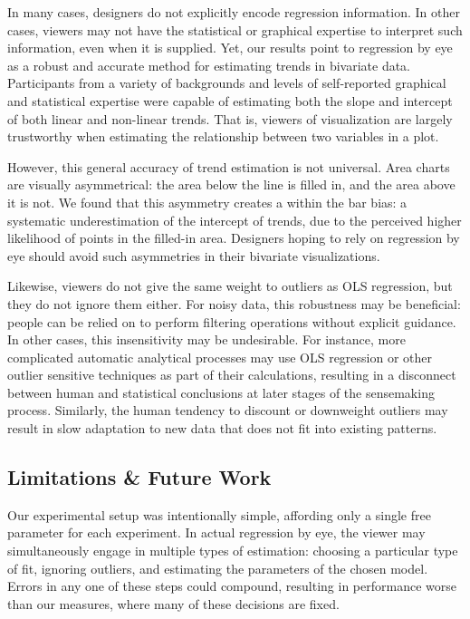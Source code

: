 \documentclass{sigchi}
\begin{document}
In many cases, designers do not explicitly encode regression information. In other cases, viewers may not have the statistical or graphical expertise to interpret such information, even when it is supplied. Yet, our results point to regression by eye as a robust and accurate method for estimating trends in bivariate data. Participants from a variety of backgrounds and levels of self-reported graphical and statistical expertise were capable of estimating both the slope and intercept of both linear and non-linear trends. That is, viewers of visualization are largely trustworthy when estimating the relationship between two variables in a plot.

However, this general accuracy of trend estimation is not universal. Area charts are visually asymmetrical: the area below the line is filled in, and the area above it is not. We found that this asymmetry creates a within the bar bias: a systematic underestimation of the intercept of trends, due to the perceived higher likelihood of points in the filled-in area. Designers hoping to rely on regression by eye should avoid such asymmetries in their bivariate visualizations.

Likewise, viewers do not give the same weight to outliers as OLS regression, but they do not ignore them either. For noisy data, this robustness may be beneficial: people can be relied on to perform filtering operations without explicit guidance. In other cases, this insensitivity may be undesirable. For instance, more complicated automatic analytical processes may use OLS regression or other outlier sensitive techniques as part of their calculations, resulting in a disconnect between human and statistical conclusions at later stages of the sensemaking process. Similarly, the human tendency to discount or downweight outliers may result in slow adaptation to new data that does not fit into existing patterns.

\subsection{Limitations \& Future Work}

Our experimental setup was intentionally simple, affording only a single free parameter for each experiment. In actual regression by eye, the viewer may simultaneously engage in multiple types of estimation: choosing a particular type of fit, ignoring outliers, and estimating the parameters of the chosen model. Errors in any one of these steps could compound, resulting in performance worse than our measures, where many of these decisions are fixed.
\end{document}
